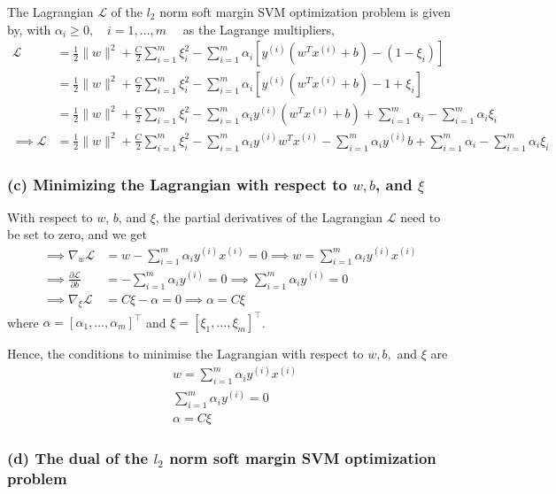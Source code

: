 The Lagrangian \( \mathcal{L} \) of the \( l_{2} \) norm soft margin SVM optimization problem is given by, with \( \alpha_{i} \geq 0, \quad i = 1, \ldots, m \quad \) as the Lagrange multipliers,
\begin{align*}
    \mathcal{L}
     & =
    \frac{1}{2}\|w\|^{2}+\frac{C}{2} \sum_{i=1}^{m} \xi_{i}^{2}
    - \sum_{i=1}^{m} \alpha_{i} \left[ y^{(i)}\left(w^{T} x^{(i)}+b\right) - (1-\xi_{i}) \right]
    \\ & =
    \frac{1}{2}\|w\|^{2}+\frac{C}{2} \sum_{i=1}^{m} \xi_{i}^{2}
    - \sum_{i=1}^{m} \alpha_{i} \left[ y^{(i)}\left(w^{T} x^{(i)}+b\right) - 1 + \xi_{i} \right]
    \\ & =
    \frac{1}{2}\|w\|^{2}+\frac{C}{2} \sum_{i=1}^{m} \xi_{i}^{2}
    - \sum_{i=1}^{m} \alpha_{i} y^{(i)} \left(w^{T} x^{(i)}+b\right)
    + \sum_{i=1}^{m} \alpha_{i} - \sum_{i=1}^{m} \alpha_{i} \xi_{i}
    \\
    \implies
    \mathcal{L}
     & =
    \frac{1}{2}\|w\|^{2}+\frac{C}{2} \sum_{i=1}^{m} \xi_{i}^{2}
    - \sum_{i=1}^{m} \alpha_{i} y^{(i)} w^{T} x^{(i)}
    - \sum_{i=1}^{m} \alpha_{i} y^{(i)} b
    + \sum_{i=1}^{m} \alpha_{i}
    - \sum_{i=1}^{m} \alpha_{i} \xi_{i}
\end{align*}

\subsubsection*{(c) Minimizing the Lagrangian with respect to \( w, b \), and \( \xi \)}

With respect to \( w \), \( b \), and \( \xi \), the partial derivatives of the Lagrangian \( \mathcal{L} \) need to be set to zero, and we get
\begin{align*}
    \implies
    \nabla_{w} \mathcal{L}
     & =
    w - \sum_{i=1}^{m} \alpha_{i} y^{(i)} x^{(i)}
    = 0
    \implies w = \sum_{i=1}^{m} \alpha_{i} y^{(i)} x^{(i)}
    \\
    \implies
    \frac{\partial \mathcal{L}}{\partial b}
     & =
    - \sum_{i=1}^{m} \alpha_{i} y^{(i)}
    = 0
    \implies \sum_{i=1}^{m} \alpha_{i} y^{(i)} = 0
    \\
    \implies
    \nabla_{\xi} \mathcal{L}
     & =
    C \xi - \alpha
    = 0
    \implies \alpha = C \xi
\end{align*}
where \( \alpha = {\left[ \alpha_{1}, \ldots, \alpha_{m} \right]}^\top \) and \( \xi = {\left[ \xi_{1}, \ldots, \xi_{m} \right]}^\top \).

Hence, the conditions to minimise the Lagrangian with respect to \( w, b, \) and \( \xi \) are
\begin{align*}
     &
    w
    =
    \sum_{i=1}^{m} \alpha_{i} y^{(i)} x^{(i)}
    \\ &
    \sum_{i=1}^{m} \alpha_{i} y^{(i)}
    =
    0
    \\ &
    \alpha
    =
    C \xi
\end{align*}

\subsubsection*{(d) The dual of the \( l_{2} \) norm soft margin SVM optimization problem}
